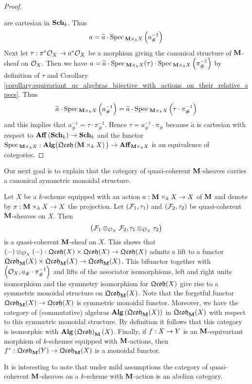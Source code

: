 \begin{proof}
\begin{center}
\end{center}
are cartesian in $\mathbf{Sch}_k$. Thus
$$a = \widetilde{a}\cdot \mathrm{Spec}\,_{\mathbf{M}\times_kX}\left(a_{\#}^{-1}\right)$$
Next let $\tau:\pi^*{\mathcal O}_X\rightarrow a^*{\mathcal O}_X$ be a morphism giving the canonical structure of $\mathbf{M}$-sheaf on ${\mathcal O}_X$. Then we have $a = \widetilde{a}\cdot \mathrm{Spec}\,_{\mathbf{M}\times_kX}(\tau) \cdot \mathrm{Spec}\,_{\mathbf{M}\times_kX}\left(\pi_{\#}^{-1}\right)$ by definition of $\tau$ and Corollary \ref{corollary:equivariant_qc_algebras_bijective_with_actions_on_their_relative_specs}. Thus
$$\widetilde{a}\cdot \mathrm{Spec}\,_{\mathbf{M}\times_kX}\left(a_{\#}^{-1}\right) = \widetilde{a} \cdot \mathrm{Spec}\,_{\mathbf{M}\times_kX}\left(\tau\cdot \pi_{\#}^{-1}\right)$$
and this implies that $a_{\#}^{-1} = \tau\cdot \pi_{\#}^{-1}$. Hence $\tau = a^{-1}_{\#}\cdot \pi_{\#}$ because $\widetilde{a}$ is cartesian with respect to $\mathbf{Aff}\left(\mathbf{Sch}_k\right)\rightarrow \mathbf{Sch}_k$ and the functor $\mathrm{Spec}\,_{\mathbf{M}\times_kX}:\mathbf{Alg}\big(\mathfrak{Qcoh}\left(\mathbf{M}\times_kX\right)\big)\rightarrow \mathbf{Aff}_{\mathbf{M}\times_kX}$ is an equivalence of categories.
\end{proof}
\noindent
Our next goal is to explain that the category of quasi-coherent $\mathbf{M}$-sheaves carries a canonical symmetric monoidal structure. 

\begin{remark}\label{remark:monoidal_structure_on_equivariant_sheaves}
Let $X$ be a $k$-scheme equipped with an action $a:\mathbf{M}\times_kX\rightarrow X$ of $\mathbf{M}$ and denote by $\pi:\mathbf{M}\times_kX\rightarrow X$ the projection. Let $({\mathcal F}_1,\tau_1)$ and $({\mathcal F}_2,\tau_2)$ be quasi-coherent $\mathbf{M}$-sheaves on $X$. Then 
$$\big({\mathcal F}_1\otimes_{{\mathcal O}_X}{\mathcal F}_2,\tau_1\otimes_{{\mathcal O}_X}\tau_2\big)$$
is a quasi-coherent $\mathbf{M}$-sheaf on $X$. This shows that $(-)\otimes_{{\mathcal O}_X}(-):\mathfrak{Qcoh}(X)\times \mathfrak{Qcoh}(X)\rightarrow \mathfrak{Qcoh}(X)$ admits a lift to a functor $\mathfrak{Qcoh}_{\mathbf{M}}(X)\times \mathfrak{Qcoh}_{\mathbf{M}}(X) \rightarrow \mathfrak{Qcoh}_{\mathbf{M}}(X)$. This bifunctor together with $\left({\mathcal O}_X,a_{\#}\cdot \pi_{\#}^{-1}\right)$ and lifts of the associator isomorphisms, left and right units isomorphism and the symmetry isomorphism for $\mathfrak{Qcoh}(X)$ give rise to a symmetric monoidal structure on $\mathfrak{Qcoh}_{\mathbf{M}}(X)$. Note that the forgetful functor $\mathfrak{Qcoh}_{\mathbf{M}}(X)\rightarrow \mathfrak{Qcoh}(X)$ is symmetric monoidal functor. Moreover, we have the category of (commutative) algebras $\mathbf{Alg}\left(\mathfrak{Qcoh}_{\mathbf{M}}(X)\right)$ in $\mathfrak{Qcoh}_{\mathbf{M}}(X)$ with respect to this symmetric monoidal structure. By definition it follows that this category is isomorphic with $\mathbf{Alg}\left(\mathfrak{Qcoh}\right)_{\mathbf{M}}(X)$. Finally, if $f:X\rightarrow Y$ is an $\mathbf{M}$-equivariant morphism of $k$-schemes equipped with $\mathbf{M}$-actions, then $f^*:\mathfrak{Qcoh}_{\mathbf{M}}(Y)\rightarrow \mathfrak{Qcoh}_{\mathbf{M}}(X)$ is a monoidal functor.
\end{remark}
\noindent
It is interesting to note that under mild assumptions the category of quasi-coherent $\mathbf{M}$-sheaves on a $k$-scheme with $\mathbf{M}$-action is an abelian category.

